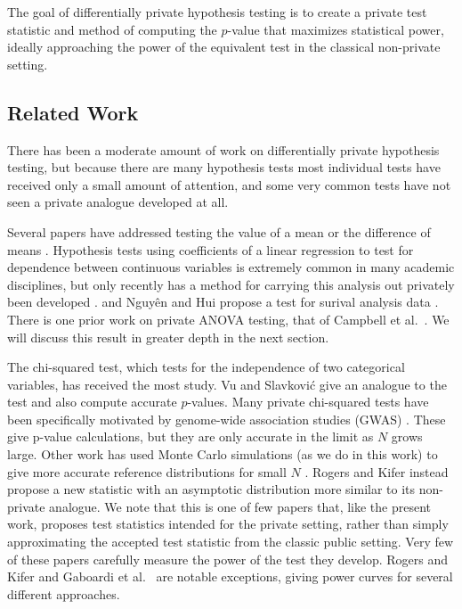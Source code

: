 \documentclass[USenglish,oneside]{article}
\newcounter{ab}
\newcounter{ar}
\begin{document}
The goal of differentially private hypothesis testing is to create a private test statistic and method of computing the $p$-value that maximizes statistical power, ideally approaching the power of the equivalent test in the classical non-private setting.


\subsection{Related Work}


There has been a moderate amount of work on differentially private hypothesis testing, but because there are many hypothesis tests most individual tests have received only a small amount of attention, and some very common tests have not seen a private analogue developed at all.  


Several papers have addressed testing the value of a mean or the difference of means \cite{solea2014differentially, d2015differential, ding2018comparing}.  Hypothesis tests using coefficients of a linear regression to test for dependence between continuous variables is extremely common in many academic disciplines, but only recently has a method for carrying this analysis out privately been developed \cite{sheffet2015differentially, barrientos2017differentially}. and Nguy{\^e}n and Hui propose a test for surival analysis data \cite{nguyen2017differentially}.  There is one prior work on private ANOVA testing, that of  Campbell et al.~\cite{campbell2018diffprivanova}.  We will discuss this result in greater depth in the next section.


The chi-squared test, which tests for the independence of two categorical variables, has received the most study.  Vu and Slavkovi\'{c} \cite{vu2009differential} give an analogue to the test and also compute accurate $p$-values.   Many private chi-squared tests have been specifically motivated by genome-wide association studies (GWAS)  \cite{fienberg2011privacy, uhlerop2013privacy, johnson2013privacy}.  These give p-value calculations, but they are only accurate in the limit as $N$ grows large.  Other work has used Monte Carlo simulations (as we do in this work) to give more accurate reference distributions for small $N$ \cite{gaboardi2016differentially, wang2015revisiting}.  Rogers and Kifer \cite{rogers2017new} instead propose a new statistic with an asymptotic distribution more similar to its non-private analogue.  We note that this is one of few papers that, like the present work, proposes test statistics intended for the private setting, rather than simply approximating the accepted test statistic from the classic public setting. Very few of these papers carefully measure the power of the test they develop.  Rogers and Kifer \cite{rogers2017new} and Gaboardi et al.~\cite{gaboardi2016differentially} are notable exceptions, giving power curves for several different approaches.
\end{document}
